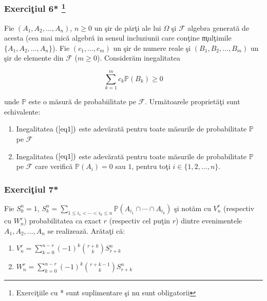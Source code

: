 \documentclass[]{article}
\def\Om{\Omega}
\def\PP{{\mathbb P}}
\def\MF{{\mathcal F}}
\let\rmarkdownfootnote\footnote%
\def\footnote{\protect\rmarkdownfootnote}
\begin{document}
\subsubsection[Exerci\c tiul 6* ]{\texorpdfstring{Exerci\c tiul 6*
\footnote{Exerci\c tiile cu * sunt suplimentare \c si nu sunt
  obligatorii}}{Exerciiul 6* }}\label{exerciiul-6}

Fie \((A_1, A_2, \dots, A_n)\), \(n\geq0\) un \c sir de p\u ar\c ti ale
lui \(\Om\) \c si \(\MF\) algebra generat\u a de acesta (cea mai mic\u a
algebr\u a in sensul incluziunii care con\c tine \c mul\c timile
\(\{A_1, A_2, \dots, A_n\}\)). Fie \((c_1, \dots,c_m)\) un \c sir de
numere reale \c si \((B_1, B_2, \dots, B_m)\) un \c sir de elemente din
\(\MF\) (\(m\geq 0\)). Consider\u am inegalitatea

\begin{equation}\label{eq1}
  \displaystyle\sum_{k=1}^{m}c_k\PP(B_k)\geq 0
\end{equation}

unde \(\PP\) este o m\u asur\u a de probabiilitate pe \(\MF\).
Urm\u atoarele propriet\u a\c ti sunt echivalente:

\begin{enumerate}
\def\labelenumi{\alph{enumi})}
\item
  Inegalitatea \((\ref{eq1})\) este adev\u arat\u a pentru toate
  m\u asurile de probabilitate \(\PP\) pe \(\MF\)
\item
  Inegalitatea \((\ref{eq1})\) este adev\u arat\u a pentru toate
  m\u asurile de probabilitate \(\PP\) pe \(\MF\) care verific\u a
  \(\PP(A_i)=0\) sau \(1\), pentru to\c ti \(i\in\{1,2,\dots,n\}\).
\end{enumerate}

\subsubsection{\texorpdfstring{Exerci\c tiul
7*}{Exerciiul 7*}}\label{exerciiul-7}

Fie \(S_{0}^{n}=1\),
\(S_{k}^{n}=\displaystyle\sum_{1\leq i_1<\cdots<i_k\leq n}\PP\left(A_{i_1}\cap\cdots\cap A_{i_k}\right)\)
\c si not\u am cu \(V_{n}^{r}\) (respectiv cu \(W_{n}^{r}\))
probabilitatea ca exact \(r\) (respectiv cel pu\c tin \(r\)) dintre
evenimentele \(A_1, A_2, \dots, A_n\) se realizeaz\u a. Ar\u ata\c ti
c\u a:

\begin{enumerate}
\def\labelenumi{\alph{enumi})}
\item
  \(V_{n}^{r}=\displaystyle\sum_{k=0}^{n-r}(-1)^k\binom{r+k}{k}S_{r+k}^{n}\)
\item
  \(W_{n}^{r}=\displaystyle\sum_{k=0}^{n-r}(-1)^k\binom{r+k-1}{k}S_{r+k}^{n}\)
\end{enumerate}
\end{document}
